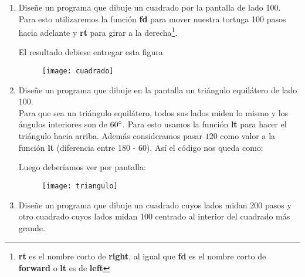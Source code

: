 \begin{enumerate}[{Ejercicio} 1.]
    \item Diseñe un programa que dibuje un cuadrado por la pantalla de lado 100.\\
    
    \asw Para esto utilizaremos la función \textbf{fd} para mover nuestra tortuga 100 pasos hacia adelante y \textbf{rt} para girar a la derecha\footnote{\textbf{rt} es el nombre corto de \textbf{right}, al igual que \textbf{fd} es el nombre corto de \textbf{forward} o \textbf{lt} es de \textbf{left}}.\\

    \begin{listing}[H]
    \end{listing}

    El resultado debiese entregar esta figura\\

    \begin{figure}[H]
        \centering
        \texttt{[image: cuadrado]}
    \end{figure}

    \item Diseñe un programa que dibuje en la pantalla un triángulo equilátero de lado 100.\\
    
    \asw Para que sea un triángulo equilátero, todos sus lados miden lo mismo y los ángulos interiores son de \(60\degree\). Para esto usamos la función \textbf{lt} para hacer el triángulo hacia arriba. Además consideramos pasar \(120\) como valor a la función \textbf{lt} (diferencia entre 180 - 60). Así el código nos queda como:\\

    \begin{listing}[H]
    \end{listing}

    Luego deberíamos ver por pantalla:

    \begin{figure}[H]
        \centering
        \texttt{[image: triangulo]}
    \end{figure}

    \item Diseñe un programa que dibuje un cuadrado cuyos lados midan 200 pasos y otro cuadrado cuyos lados midan 100 centrado al interior del cuadrado más grande.
    

\end{enumerate}
